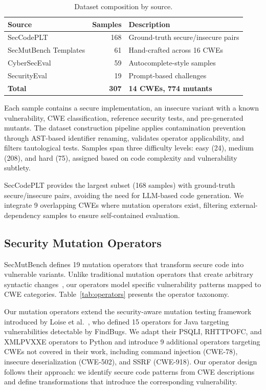 \documentclass[sigconf,review,anonymous]{acmart}
\begin{document}
\begin{table}[t]
\caption{Dataset composition by source.}
\label{tab:dataset}
\small
\begin{tabular}{lrl}
\toprule
\textbf{Source} & \textbf{Samples} & \textbf{Description} \\
\midrule
SecCodePLT~\cite{secccodeplt2024} & 168 & Ground-truth secure/insecure pairs \\
SecMutBench Templates & 61 & Hand-crafted across 16 CWEs \\
CyberSecEval~\cite{bhatt2023cyberseceval} & 59 & Autocomplete-style samples \\
SecurityEval~\cite{siddiq2022securityeval} & 19 & Prompt-based challenges \\
\midrule
\textbf{Total} & \textbf{307} & \textbf{14 CWEs, 774 mutants} \\
\bottomrule
\end{tabular}
\end{table}

Each sample contains a secure implementation, an insecure variant with a known vulnerability, CWE classification, reference security tests, and pre-generated mutants. The dataset construction pipeline applies contamination prevention through AST-based identifier renaming, validates operator applicability, and filters tautological tests. Samples span three difficulty levels: easy (24), medium (208), and hard (75), assigned based on code complexity and vulnerability subtlety.

SecCodePLT provides the largest subset (168 samples) with ground-truth secure/insecure pairs, avoiding the need for LLM-based code generation. We integrate 9 overlapping CWEs where mutation operators exist, filtering external-dependency samples to ensure self-contained evaluation.


\subsection{Security Mutation Operators}

SecMutBench defines 19 mutation operators that transform secure code into vulnerable variants. Unlike traditional mutation operators that create arbitrary syntactic changes~\cite{demillo1978hints}, our operators model specific vulnerability patterns mapped to CWE categories. Table~\ref{tab:operators} presents the operator taxonomy.

Our mutation operators extend the security-aware mutation testing framework introduced by Loise et al.~\cite{loise2017security}, who defined 15 operators for Java targeting vulnerabilities detectable by FindBugs. We adapt their PSQLI, RHTTPOFC, and XMLPVXXE operators to Python and introduce 9 additional operators targeting CWEs not covered in their work, including command injection (CWE-78), insecure deserialization (CWE-502), and SSRF (CWE-918). Our operator design follows their approach: we identify secure code patterns from CWE descriptions and define transformations that introduce the corresponding vulnerability.
\end{document}
